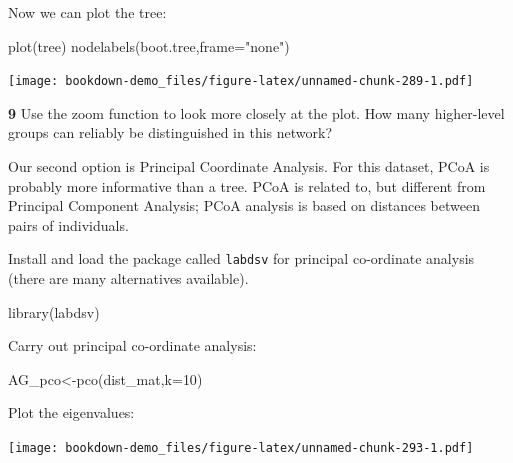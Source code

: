 \documentclass[
]{book}
\makeatletter
\newenvironment{Shaded}{\begin{snugshade}}{\end{snugshade}}
\newcommand{\AttributeTok}[1]{\textcolor[rgb]{0.77,0.63,0.00}{#1}}
\newcommand{\DecValTok}[1]{\textcolor[rgb]{0.00,0.00,0.81}{#1}}
\newcommand{\FunctionTok}[1]{\textcolor[rgb]{0.00,0.00,0.00}{#1}}
\newcommand{\NormalTok}[1]{#1}
\newcommand{\OtherTok}[1]{\textcolor[rgb]{0.56,0.35,0.01}{#1}}
\newcommand{\SpecialCharTok}[1]{\textcolor[rgb]{0.00,0.00,0.00}{#1}}
\newcommand{\StringTok}[1]{\textcolor[rgb]{0.31,0.60,0.02}{#1}}
\newenvironment{kframe}{%
\medskip{}
\setlength{\fboxsep}{.8em}
 \def\at@end@of@kframe{}%
 \ifinner\ifhmode%
  \def\at@end@of@kframe{\end{minipage}}%
  \begin{minipage}{\columnwidth}%
 \fi\fi%
 \def\FrameCommand##1{\hskip\@totalleftmargin \hskip-\fboxsep
 \colorbox{shadecolor}{##1}\hskip-\fboxsep
     \hskip-\linewidth \hskip-\@totalleftmargin \hskip\columnwidth}%
 \MakeFramed {\advance\hsize-\width
   \@totalleftmargin\z@ \linewidth\hsize
   \@setminipage}}%
 {\par\unskip\endMakeFramed%
 \at@end@of@kframe}
\newenvironment{rmdblock}[1]
  {
  \begin{itemize}
  \renewcommand{\labelitemi}{
    \raisebox{-.7\height}[0pt][0pt]{
      {\setkeys{Gin}{width=3em,keepaspectratio}\texttt{[image: images/\#1]}}
    }
  }
  \setlength{\fboxsep}{1em}
  \begin{kframe}
  \item
  }
  {
  \end{kframe}
  \end{itemize}
  }
\newenvironment{rmdquiz}
  {\begin{rmdblock}{quiz}}
  {\end{rmdblock}}
\makeatother
\begin{document}
Now we can plot the tree:

\begin{Shaded}
\begin{Highlighting}[]
\FunctionTok{plot}\NormalTok{(tree)}
\FunctionTok{nodelabels}\NormalTok{(boot.tree,}\AttributeTok{frame=}\StringTok{"none"}\NormalTok{)}
\end{Highlighting}
\end{Shaded}

\texttt{[image: bookdown-demo\_files/figure-latex/unnamed-chunk-289-1.pdf]}

\begin{rmdquiz}
\textbf{9} Use the zoom function to look more closely at the plot. How many higher-level groups can reliably be distinguished in this network?
\end{rmdquiz}

Our second option is Principal Coordinate Analysis. For this dataset, PCoA is probably more informative than a tree. PCoA is related to, but different from Principal Component Analysis; PCoA analysis is based on distances between pairs of individuals.

Install and load the package called \texttt{labdsv} for principal co-ordinate analysis (there are many alternatives available).

\begin{Shaded}
\begin{Highlighting}[]
\FunctionTok{library}\NormalTok{(labdsv)}
\end{Highlighting}
\end{Shaded}

Carry out principal co-ordinate analysis:

\begin{Shaded}
\begin{Highlighting}[]
\NormalTok{AG\_pco}\OtherTok{\textless{}{-}}\FunctionTok{pco}\NormalTok{(dist\_mat,}\AttributeTok{k=}\DecValTok{10}\NormalTok{)}
\end{Highlighting}
\end{Shaded}

Plot the eigenvalues:

\begin{Shaded}
\end{Shaded}

\texttt{[image: bookdown-demo\_files/figure-latex/unnamed-chunk-293-1.pdf]}
\end{document}
